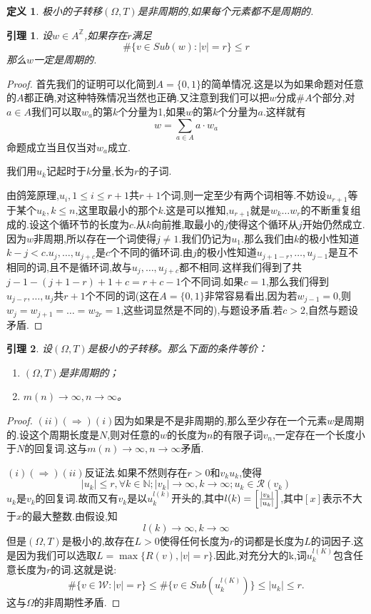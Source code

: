 \documentclass[a4paper,11pt,oneside]{book}
\newtheorem{lemma}{\textbf{\hspace{0.7cm}引理}}[section]
\newtheorem{definition}{\textbf{\hspace{0.7cm}定义}}[section]
\begin{document}
\begin{definition}
极小的子转移$(\Omega,T)$是非周期的,如果每个元素都不是周期的.
\end{definition}
\begin{lemma}
设$w\in A^{\mathbb{Z}}$,如果存在$r$满足
$$\#\{v\in Sub(w):|v|=r\}\leq r$$
那么$w$一定是周期的.
\end{lemma}
\begin{proof}
首先我们的证明可以化简到$A=\{0,1\}$的简单情况.这是以为如果命题对任意的$A$都正确,对这种特殊情况当然也正确.又注意到我们可以把$w$分成$\#A$个部分,对$a\in A$我们可以取$w_a$的第$k$个分量为1,如果$w$的第$k$个分量为$a$.这样就有
$$w=\sum_{a\in A} a\cdot w_a$$
命题成立当且仅当对$w_a$成立.


我们用$u_k$记起时于$k$分量,长为$r$的子词.

由鸽笼原理,$u_{i},1\leq i\leq r+1$共$r+1$个词,则一定至少有两个词相等.不妨设$u_{r+1}$等于某个$u_k,k\leq n$,这里取最小的那个$k$.这是可以推知,$u_{r+1}$就是$w_k\ldots w_r$的不断重复组成的.设这个循环节的长度为$c$.从$k$向前推,取最小的$j$使得这个循环从$j$开始仍然成立.因为$w$非周期,所以存在一个词使得$j\ne 1$.我们仍记为$u_1$.那么我们由$k$的极小性知道$k-j< c$.$u_j,\ldots ,u_{j+c}$是$c$个不同的循环词.由$j$的极小性知道$u_{j+1-r},\ldots ,u_{j-1}$是互不相同的词,且不是循环词,故与$u_j,\ldots ,u_{j+c}$都不相同.这样我们得到了共$j-1-(j+1-r)+1+c=r+c-1$个不同词.如果$c=1$,那么我们得到$u_{j-r},\ldots,u_j$共$r+1$个不同的词(这在$A=\{0,1\}$非常容易看出,因为若$w_{j-1}=0$,则$w_j=w_{j+1}=\ldots=w_{2r}=1$,这些词显然是不同的),与题设矛盾.若$c>2$,自然与题设矛盾.
\end{proof}
\begin{lemma}
\label{l:1}
设$(\Omega,T)$是极小的子转移。那么下面的条件等价：
\begin{enumerate}
\item $(\Omega,T)$是非周期的；
\item $m(n)\rightarrow \infty,n\rightarrow \infty$。
\end{enumerate}
\end{lemma}

\begin{proof}
$(ii)(\Rightarrow)(i)$因为如果是不是非周期的,那么至少存在一个元素$w$是周期的.设这个周期长度是$N$,则对任意的$w$的长度为$n$的有限子词$v_n$,一定存在一个长度小于$N$的回复词.这与$m(n)\rightarrow \infty,n\rightarrow \infty$矛盾.

$(i)(\Rightarrow)(ii)$反证法.如果不然则存在$r>0$和${v_k}{u_k}$,使得
$$|u_k|\leq r,\forall k\in\mathbb{N};|v_k|\rightarrow \infty ,k\rightarrow \infty;u_k\in\mathcal{R}(v_k)$$
$u_k$是$v_k$的回复词.故而又有$v_k$是以$u_k^{l(k)}$开头的,其中$l(k)=\left[{|v_k|\over |u_k|}\right]$,其中$[x]$表示不大于$x$的最大整数.由假设,知
\begin{equation*}
l(k)\rightarrow \infty,k\rightarrow \infty
\end{equation*}
但是$(\Omega,T)$是极小的,故存在$L>0$使得任何长度为$r$的词都是长度为$L$的词因子.这是因为我们可以选取$L=\max\{R(v),|v|=r\}$.因此,对充分大的k,词$u_k^{l(K)}$包含任意长度为$r$的词.这就是说:
$$\#\{v\in\mathcal{W}:|v|=r\}\leq\#\{v\in Sub(u_k^{l(K)})\}\leq |u_k|\leq r.$$
这与$\Omega$的非周期性矛盾.

\end{proof}
\end{document}
